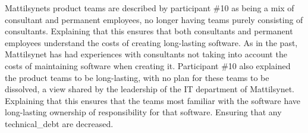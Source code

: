 
Mattilsynets product teams are described by participant \#10 as being a mix of consultant and permanent employees, no longer having teams purely consisting of consultants. Explaining that this ensures that both consultants and permanent employees understand the costs of creating long-lasting software. As in the past, Mattilsynet has had experiences with consultants not taking into account the costs of maintaining software when creating it. Participant \#10 also explained the product teams to be long-lasting, with no plan for these teams to be dissolved, a view shared by the leadership of the IT department of Mattilsynet. Explaining that this ensures that the teams most familiar with the software have long-lasting ownership of responsibility for that software. Ensuring that any \gls{technical_debt} are decreased.



